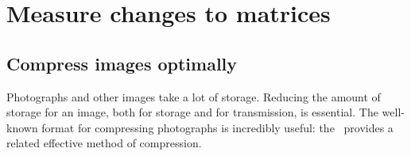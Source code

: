 
\section{Measure changes to matrices}
\label{sec:mctm}
\secttoc




\subsection{Compress images optimally}
\label{sec:ciio}


Photographs and other images take a lot of storage.
Reducing the amount of storage for an image, both for storage and for transmission, is essential.
The well-known  format for compressing photographs is incredibly useful: the \svd\ provides a related effective method of compression.

\begin{comment} 
Introduce digital {image compression} by \svd{}s \pooliv{p.607--8} \holti{p.336--7}  \cite[\S07]{Davis99a}  \cite[Ch.~9, 11]{Chartier2015}
\end{comment}



